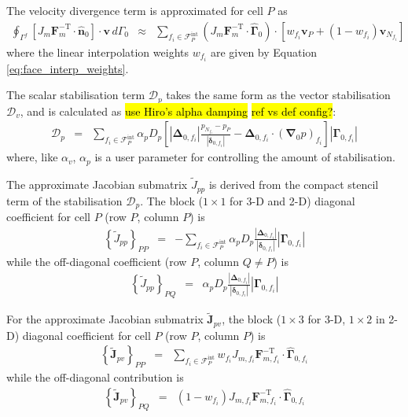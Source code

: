 \documentclass[sn-mathphys,Numbered]{sn-jnl}%
\newcommand{\bb}{\boldsymbol}
\begin{document}
The velocity divergence term is approximated for cell $P$ as
\begin{eqnarray}
	\oint_{\Gamma^f}  \left[ J_m \bb{F}_m^{-\text{T}}  \cdot \hat{\bb{n}}_0 \right] \cdot \bb{v} \, d\Gamma_0
	&\approx&
		\sum_{f_i \in \mathcal{F}^{\text{int}}_P}
		\left( J_m \bb{F}_m^{-\text{T}}  \cdot \hat{\bb{\Gamma}}_0 \right)
		\cdot \left[ w_{f_i} \bb{v}_P + (1 - w_{f_i})\bb{v}_{N_{f_i}}  \right]
\end{eqnarray}
where the linear interpolation weights $w_{f_i}$ are given by Equation \ref{eq:face_interp_weights}.

The scalar stabilisation term $\mathcal{D}_p$ takes the same form as the vector stabilisation $\mathcal{D}_v$, and is calculated as \hl{use Hiro's alpha damping} \hl{ref vs def config?}:
\begin{eqnarray}
	\mathcal{D}_p
	&=& \sum_{f_i \in \mathcal{F}^{\text{int}}_P} \alpha_p D_p \left[
		\left|\bb{\Delta}_{0,f_i} \right| \frac{ p_{N_{f_i}} - p_P}{\left|\bb{\delta}_{0,f_i}\right|}	- \bb{\Delta}_{0,f_i} \cdot \left(\bb{\nabla}_0 p \right)_{f_i}
		\right]    \left|\bb{\Gamma}_{0,f_i}\right|
\end{eqnarray}
where, like $\alpha_v$, $\alpha_p$ is a user parameter for controlling the amount of stabilisation.

The approximate Jacobian submatrix $\tilde{J}_{pp}$ is derived from the compact stencil term of the stabilisation $\mathcal{D}_p$.
The block ($1\times1$ for 3-D and 2-D) diagonal coefficient for cell $P$ (row $P$, column $P$) is
\begin{eqnarray}
	\left\{ \tilde{J}_{pp} \right\}_{PP} &=&
		- \sum_{f_i \in \mathcal{F}^{\text{int}}_P}  \alpha_p D_p
		\frac{ \left|\bb{\Delta}_{0,f_i} \right| }{\left|\bb{\delta}_{0,f_i}\right|}    \left|\bb{\Gamma}_{0,f_i}\right|
\end{eqnarray}
while the off-diagonal coefficient (row $P$, column $Q \neq P$) is
\begin{eqnarray}
	\left\{ \tilde{J}_{pp} \right\}_{PQ}	 &=&
		\alpha_p D_p \frac{ \left|\bb{\Delta}_{0,f_i} \right| }{\left|\bb{\delta}_{0,f_i}\right|}    \left|\bb{\Gamma}_{0,f_i}\right|
\end{eqnarray}


For the approximate Jacobian submatrix $\tilde{\bb{J}}_{pv}$, the block ($1\times3$ for 3-D, $1\times2$ in 2-D) diagonal coefficient for cell $P$ (row $P$, column $P$) is
\begin{eqnarray}
	\left\{ \tilde{\bb{J}}_{pv} \right\}_{PP}	&=&
		\sum_{f_i \in \mathcal{F}^{\text{int}}_P} w_{f_i}  J_{m,f_i} \bb{F}_{m,f_i}^{-\text{T}}  \cdot \hat{\bb{\Gamma}}_{0,f_i}
\end{eqnarray}
while the off-diagonal contribution is
\begin{eqnarray}
	\left\{ \tilde{\bb{J}}_{pv} \right\}_{PQ} &=&
		(1 - w_{f_i})  J_{m,f_i} \bb{F}_{m,f_i}^{-\text{T}}  \cdot \hat{\bb{\Gamma}}_{0,f_i}
\end{eqnarray}
\end{document}
